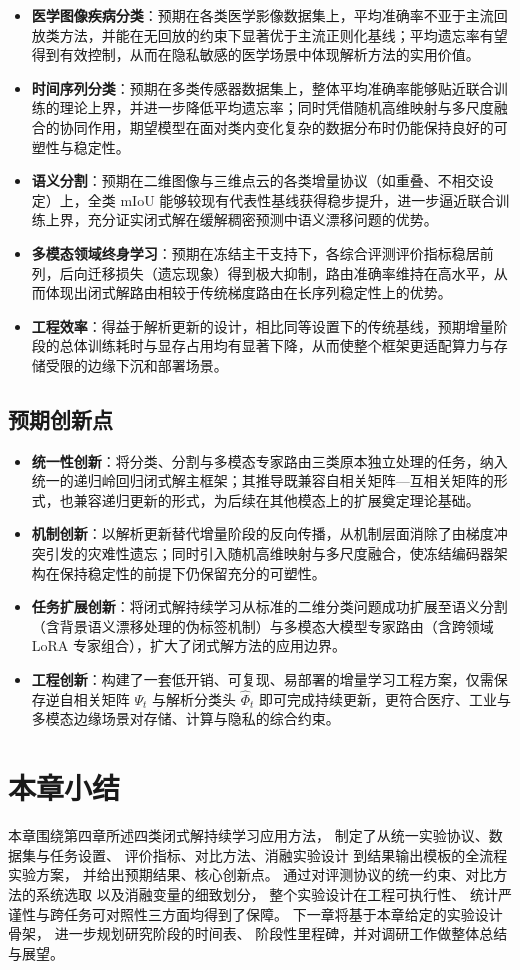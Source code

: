 \begin{itemize}
    \item \textbf{医学图像疾病分类}：预期在各类医学影像数据集上，平均准确率不亚于主流回放类方法，并能在无回放的约束下显著优于主流正则化基线；平均遗忘率有望得到有效控制，从而在隐私敏感的医学场景中体现解析方法的实用价值。
    \item \textbf{时间序列分类}：预期在多类传感器数据集上，整体平均准确率能够贴近联合训练的理论上界，并进一步降低平均遗忘率；同时凭借随机高维映射与多尺度融合的协同作用，期望模型在面对类内变化复杂的数据分布时仍能保持良好的可塑性与稳定性。
    \item \textbf{语义分割}：预期在二维图像与三维点云的各类增量协议（如重叠、不相交设定）上，全类 mIoU 能够较现有代表性基线获得稳步提升，进一步逼近联合训练上界，充分证实闭式解在缓解稠密预测中语义漂移问题的优势。
    \item \textbf{多模态领域终身学习}：预期在冻结主干支持下，各综合评测评价指标稳居前列，后向迁移损失（遗忘现象）得到极大抑制，路由准确率维持在高水平，从而体现出闭式解路由相较于传统梯度路由在长序列稳定性上的优势。
    \item \textbf{工程效率}：得益于解析更新的设计，相比同等设置下的传统基线，预期增量阶段的总体训练耗时与显存占用均有显著下降，从而使整个框架更适配算力与存储受限的边缘下沉和部署场景。
\end{itemize}

\subsection{预期创新点}

\begin{itemize}
    \item \textbf{统一性创新}：将分类、分割与多模态专家路由三类原本独立处理的任务，纳入统一的递归岭回归闭式解主框架；其推导既兼容自相关矩阵—互相关矩阵的形式，也兼容递归更新的形式，为后续在其他模态上的扩展奠定理论基础。
    \item \textbf{机制创新}：以解析更新替代增量阶段的反向传播，从机制层面消除了由梯度冲突引发的灾难性遗忘；同时引入随机高维映射与多尺度融合，使冻结编码器架构在保持稳定性的前提下仍保留充分的可塑性。
    \item \textbf{任务扩展创新}：将闭式解持续学习从标准的二维分类问题成功扩展至语义分割（含背景语义漂移处理的伪标签机制）与多模态大模型专家路由（含跨领域 LoRA 专家组合），扩大了闭式解方法的应用边界。
    \item \textbf{工程创新}：构建了一套低开销、可复现、易部署的增量学习工程方案，仅需保存逆自相关矩阵 $\Psi_t$ 与解析分类头 $\widehat{\Phi}_t$ 即可完成持续更新，更符合医疗、工业与多模态边缘场景对存储、计算与隐私的综合约束。
\end{itemize}



\section{本章小结}

本章围绕第四章所述四类闭式解持续学习应用方法，
制定了从统一实验协议、数据集与任务设置、
评价指标、对比方法、消融实验设计
到结果输出模板的全流程实验方案，
并给出预期结果、核心创新点。
通过对评测协议的统一约束、对比方法的系统选取
以及消融变量的细致划分，
整个实验设计在工程可执行性、
统计严谨性与跨任务可对照性三方面均得到了保障。
下一章将基于本章给定的实验设计骨架，
进一步规划研究阶段的时间表、
阶段性里程碑，并对调研工作做整体总结与展望。

